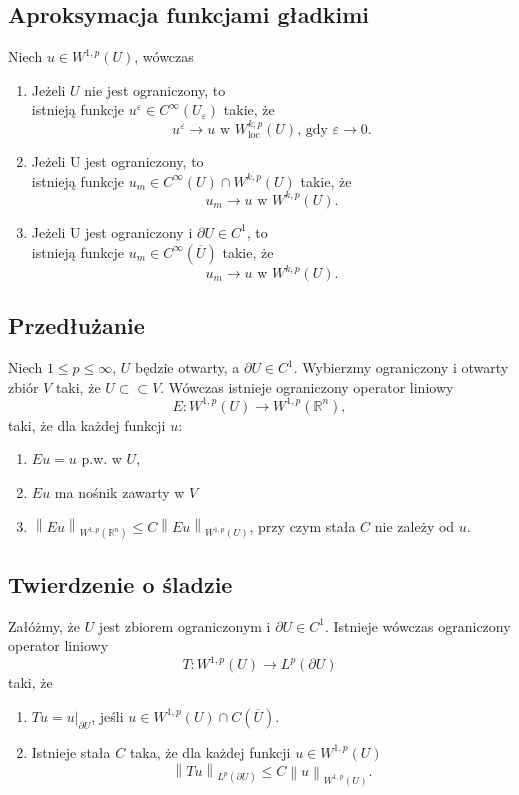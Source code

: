 \documentclass[letterpaper,12pt]{article}
\newcommand{\norm}[1]{\left\lVert#1\right\rVert}
\newcommand{\R}{\mathbb{R}}
\renewcommand{\leq}{\leqslant}
\begin{document}
\subsection{Aproksymacja funkcjami gładkimi}
Niech $u \in W^{1,p}(U)$, wówczas
\begin{enumerate}
    \item Jeżeli $U$ nie jest ograniczony, to\\
          istnieją funkcje $u^\varepsilon \in C^\infty(U_\varepsilon)$ takie, że
          $$ u^\varepsilon \to u \text{ w } W^{k,p}_\text{loc}(U) \text{, gdy } \varepsilon \to 0.  $$
    \item Jeżeli U jest ograniczony, to\\
          istnieją funkcje $u_m \in C^\infty(U) \cap W^{k,p}(U)$ takie, że
          $$ u_m \to u \text{ w } W^{k,p}(U).  $$
    \item Jeżeli U jest ograniczony i $\partial U \in C^1$, to\\
          istnieją funkcje $u_m \in C^\infty(\overline{U})$ takie, że
          $$ u_m \to u \text{ w } W^{k,p}(U).  $$
\end{enumerate}

\subsection{Przedłużanie}
Niech $1 \leq p \leq \infty$, $U$ będzie otwarty, a $\partial U \in C^1$. Wybierzmy ograniczony i otwarty zbiór $V$ taki, że $U \subset \subset V$. Wówczas istnieje ograniczony operator liniowy
$$ E: W^{1,p}(U) \to W^{1,p}(\R^n), $$
taki, że dla każdej funkcji $u$:
\begin{enumerate}
    \item $Eu = u$ p.w. w $U$,
    \item $Eu$ ma nośnik zawarty w $V$
    \item $\norm{Eu}_{W^{1,p}(\R^n)} \leq C \norm{Eu}_{W^{1,p}(U)}$, przy czym stała $C$ nie zależy od $u$.
\end{enumerate}

\subsection{Twierdzenie o śladzie}
Załóżmy, że $U$ jest zbiorem ograniczonym i $\partial U \in C^1$. Istnieje wówczas ograniczony operator liniowy
$$ T: W^{1,p}(U) \to L^p(\partial U) $$
taki, że
\begin{enumerate}
    \item $Tu = u|_{\partial U}$, jeśli $u \in W^{1,p}(U) \cap C(\overline{U}).$
    \item Istnieje stała $C$ taka, że dla każdej funkcji $u \in W^{1,p}(U)$
          $$\norm{Tu}_{L^p(\partial U)} \leq C \norm{u}_{W^{1,p}(U)}.$$
\end{enumerate}
\end{document}
